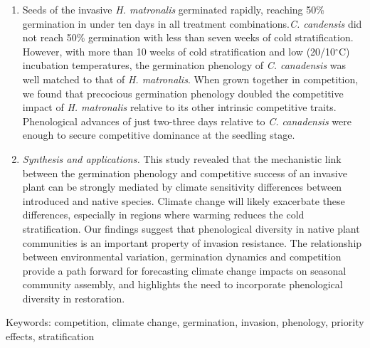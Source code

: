 \documentclass{article}[11pt]
\begin{document}
\begin{enumerate}
\item Seeds of the invasive \textit{H. matronalis} germinated rapidly, reaching 50\% germination in under ten days in all treatment combinations.\textit{C. candensis} did not reach 50\% germination with less than seven weeks of cold stratification. However, with more than 10 weeks of cold stratification and low (20/10$^{\circ}$C) incubation temperatures, the germination phenology of \textit{C. canadensis} was well matched to that of \textit{H. matronalis}. When grown together in competition, we found that precocious germination phenology doubled the competitive impact of \textit{H. matronalis} relative to its other intrinsic competitive traits. Phenological advances of just two-three days relative to \textit{C. canadensis} were enough to secure competitive dominance at the seedling stage. %
\item \textit{Synthesis and applications.} This study revealed that the mechanistic link between the germination phenology and competitive success of an invasive plant can be strongly mediated by climate sensitivity differences between introduced and native species. Climate change will likely exacerbate these differences, especially in regions where warming reduces the cold stratification. Our findings suggest that phenological diversity in native plant communities is an important property of invasion resistance. The relationship between environmental variation, germination dynamics and competition provide a path forward for forecasting climate change impacts on seasonal community assembly, and highlights the need to incorporate phenological diversity in restoration.

\end{enumerate}

Keywords: competition, climate change, germination, invasion, phenology, priority effects, stratification

\pagebreak
\end{document}
